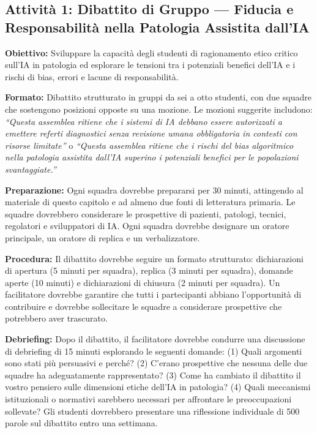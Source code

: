 \subsection{Attività 1: Dibattito di Gruppo --- Fiducia e Responsabilità nella Patologia Assistita dall'IA}

\textbf{Obiettivo:} Sviluppare la capacità degli studenti di ragionamento etico critico sull'IA in patologia ed esplorare le tensioni tra i potenziali benefici dell'IA e i rischi di bias, errori e lacune di responsabilità.

\textbf{Formato:} Dibattito strutturato in gruppi da sei a otto studenti, con due squadre che sostengono posizioni opposte su una mozione. Le mozioni suggerite includono: \emph{``Questa assemblea ritiene che i sistemi di IA debbano essere autorizzati a emettere referti diagnostici senza revisione umana obbligatoria in contesti con risorse limitate''} o \emph{``Questa assemblea ritiene che i rischi del bias algoritmico nella patologia assistita dall'IA superino i potenziali benefici per le popolazioni svantaggiate.''}

\textbf{Preparazione:} Ogni squadra dovrebbe prepararsi per 30 minuti, attingendo al materiale di questo capitolo e ad almeno due fonti di letteratura primaria. Le squadre dovrebbero considerare le prospettive di pazienti, patologi, tecnici, regolatori e sviluppatori di IA. Ogni squadra dovrebbe designare un oratore principale, un oratore di replica e un verbalizzatore.

\textbf{Procedura:} Il dibattito dovrebbe seguire un formato strutturato: dichiarazioni di apertura (5 minuti per squadra), replica (3 minuti per squadra), domande aperte (10 minuti) e dichiarazioni di chiusura (2 minuti per squadra). Un facilitatore dovrebbe garantire che tutti i partecipanti abbiano l'opportunità di contribuire e dovrebbe sollecitare le squadre a considerare prospettive che potrebbero aver trascurato.

\textbf{Debriefing:} Dopo il dibattito, il facilitatore dovrebbe condurre una discussione di debriefing di 15 minuti esplorando le seguenti domande: (1) Quali argomenti sono stati più persuasivi e perché? (2) C'erano prospettive che nessuna delle due squadre ha adeguatamente rappresentato? (3) Come ha cambiato il dibattito il vostro pensiero sulle dimensioni etiche dell'IA in patologia? (4) Quali meccanismi istituzionali o normativi sarebbero necessari per affrontare le preoccupazioni sollevate? Gli studenti dovrebbero presentare una riflessione individuale di 500 parole sul dibattito entro una settimana.

